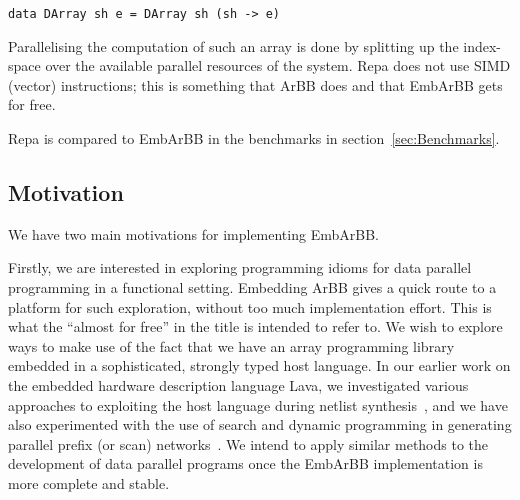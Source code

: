 \begin{verbatim} 
data DArray sh e = DArray sh (sh -> e)  
\end{verbatim} 

Parallelising the computation of such an array is done by splitting up the 
index-space over the available parallel resources of the system. Repa does 
not use SIMD (vector) instructions; this is something that ArBB does and 
that EmbArBB gets for free. 

Repa is compared to EmbArBB in the benchmarks in section~\ref{sec:Benchmarks}.


\subsection{Motivation}

We have two main motivations for implementing EmbArBB.

Firstly, we are interested in exploring programming idioms for
data parallel programming in a functional setting. Embedding ArBB gives
a quick route to a platform for such exploration, without too much implementation effort. This is what the ``almost for free'' in the title is intended to refer to.
We wish to explore ways to make use of the fact that we have an array programming library embedded in a sophisticated, strongly typed host language. In our earlier work on the embedded hardware description language Lava, we investigated various approaches to exploiting the host language during netlist synthesis~\cite{LavaMultipliers}, and we have also experimented with the use of search and dynamic programming in generating parallel prefix (or scan) networks~\cite{SheeranJFP}. We intend to apply similar methods to the development of data parallel programs once the EmbArBB implementation is more complete and stable.




